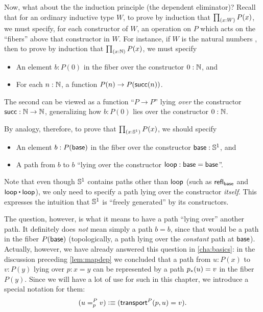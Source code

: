 %
%
Now, what about the the induction principle (the dependent eliminator)?
Recall that for an ordinary inductive type $W$, to prove by induction that $\prd{x:W} P(x)$, we must specify, for each constructor of $W$, an operation on $P$ which acts on the ``fibers'' above that constructor in $W$.
For instance, if $W$ is the natural numbers \nat, then to prove by induction that $\prd{x:\nat} P(x)$, we must specify
\begin{itemize}
\item An element $b:P(0)$ in the fiber over the constructor $0:\mathbb{N}$, and
\item For each $n:\mathbb{N}$, a function $P(n) \to P(\mathsf{succ}(n))$.
\end{itemize}
The second can be viewed as a function ``$P\to P$'' lying \emph{over} the constructor $\mathsf{succ}:\mathbb{N}\to\mathbb{N}$, generalizing how $b:P(0)$ lies over the constructor $0:\mathbb{N}$.

By analogy, therefore, to prove that $\prd{x:\Sn^1} P(x)$, we should specify
\begin{itemize}
\item An element $b:P(\mathsf{base})$ in the fiber over the constructor $\mathsf{base}:\mathbb{S}^1$, and
\item A path from $b$ to $b$ ``lying over the constructor $\mathsf{loop}:\mathsf{base}=\mathsf{base}$''.
\end{itemize}
Note that even though $\mathbb{S}^1$ contains paths other than $\mathsf{loop}$ (such as $\mathsf{refl}_{\mathsf{base}}$ and $\lloop\ct\lloop$), we only need to specify a path lying over the constructor \emph{itself}.
This expresses the intuition that $\mathbb{S}^1$ is ``freely generated'' by its constructors.

The question, however, is what it means to have a path ``lying over'' another path.
It definitely does \emph{not} mean simply a path $b=b$, since that would be a path in the fiber $P(\mathsf{base})$ (topologically, a path lying over the \emph{constant} path at $\mathsf{base}$).
Actually, however, we have already answered this question in \autoref{cha:basics}: in the discussion preceding \autoref{lem:mapdep} we concluded that a path from $u:P(x)$ to $v:P(y)$ lying over $p:x=y$ can be represented by a path ${p}_{*}\mathopen{}\left({u}\right)\mathclose{} = v$ in the fiber $P(y)$.
Since we will have a lot of use for such 
%
in this chapter, we introduce a special notation for them:
\begin{equation}
  (\dpath P p u v) \defeq (\transfib{P} p u = v).\label{eq:dpath}
\end{equation}


